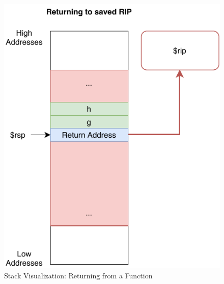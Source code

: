 \begin{figure}[htp!]
    \centering
    \includegraphics[width=\textwidth]{assets/figures/chapter3/return.pdf}
    \caption{Stack Visualization: Returning from a Function}
    \label{fig:return-stack}
\end{figure}
